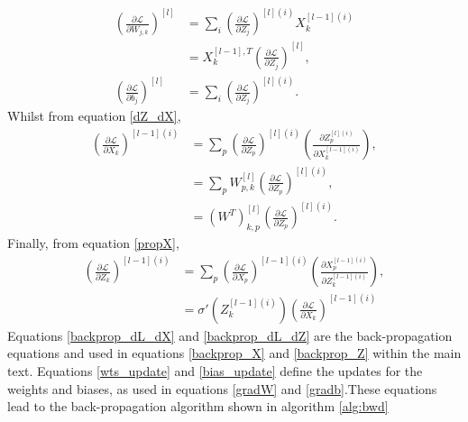 \documentclass[11pt,twocolumn]{article}
\begin{document}
\begin{align}
\left(\frac{\partial \mathcal{L}}{\partial W_{j,k}}\right)^{[l]}&=\sum_{i}\left(\frac{\partial \mathcal{L}}{\partial Z_{j}}\right)^{[l](i)}X_{k}^{[l-1](i)}\nonumber\\
&=X_{k}^{[l-1],T}\left(\frac{\partial \mathcal{L}}{\partial Z_{j}}\right)^{[l]},\label{wts_update}\\
\left(\frac{\partial \mathcal{L}}{\partial b_{j}}\right)^{[l]}&=\sum_{i}\left(\frac{\partial \mathcal{L}}{\partial Z_{j}}\right)^{[l](i)}\label{bias_update}.
\end{align}
Whilst from equation \ref{dZ_dX},
\begin{align}
\left(\frac{\partial \mathcal{L}}{\partial X_{k}}\right)^{[l-1](i)}&=\sum_{p}\left(\frac{\partial \mathcal{L}}{\partial Z_{p}}\right)^{[l](i)}\left(\frac{\partial Z_{p}^{[l](i)}}{\partial X_{k}^{[l-1](i)}}\right),\nonumber\\
&=\sum_{p} W_{p,k}^{[l]}\left(\frac{\partial \mathcal{L}}{\partial Z_{p}}\right)^{[l](i)},\nonumber\\
&=\left(W^{T}\right)_{k,p}^{[l]}\left(\frac{\partial \mathcal{L}}{\partial Z_{p}}\right)^{[l](i)}\label{backprop_dL_dX}.
\end{align}
Finally, from equation \ref{propX},
\begin{align}
\left(\frac{\partial \mathcal{L}}{\partial Z_{k}}\right)^{[l-1](i)}&=\sum_{p}\left(\frac{\partial \mathcal{L}}{\partial X_{p}}\right)^{[l-1](i)}\left(\frac{\partial X_{p}^{[l-1](i)}}{\partial Z_{k}^{[l-1](i)}}\right),\nonumber\\
&= \sigma'{(Z_{k}^{[l-1](i)})}\left(\frac{\partial \mathcal{L}}{\partial X_{k}}\right)^{[l-1](i)}\label{backprop_dL_dZ}
\end{align}
Equations \ref{backprop_dL_dX} and \ref{backprop_dL_dZ} are the back-propagation equations and used in equations \ref{backprop_X} and \ref{backprop_Z} within the main text. Equations \ref{wts_update} and \ref{bias_update} define the updates for the weights and biases, as used in equations \ref{gradW} and \ref{gradb}.These equations lead to the back-propagation algorithm shown in algorithm \ref{alg:bwd} 

\onecolumn
\end{document}
